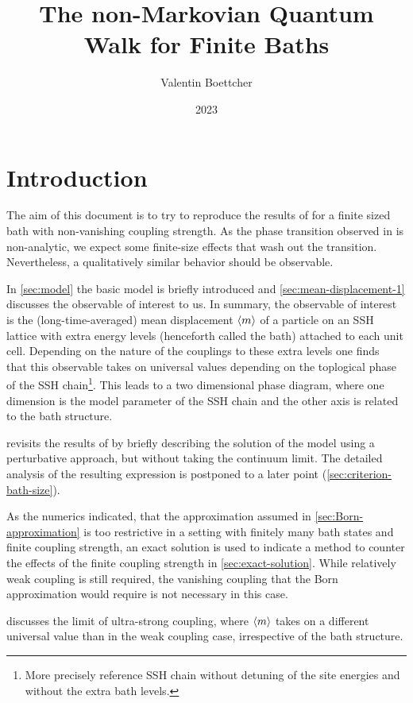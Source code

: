 \documentclass[fontsize=10pt,paper=b5,open=any,
twoside=no,toc=listof,toc=bibliography,headings=optiontohead,
captions=nooneline,captions=tableabove,english,DIV=15,numbers=noenddot,final,parskip=half-,
headinclude=true,footinclude=false,BCOR=0mm]{scrartcl}
\author{Valentin Boettcher}
\title{The non-Markovian Quantum Walk for Finite Baths}
\date{2023}
\begin{document}
\maketitle
\tableofcontents


\section{Introduction}
\label{sec:introduction}
The aim of this document is to try to reproduce the results of
\cite{Ricottone2020} for a finite sized bath with non-vanishing
coupling strength. As the phase transition observed in
 is non-analytic, we expect some finite-size
effects that wash out the transition. Nevertheless, a qualitatively
similar behavior should be observable.

In \cref{sec:model} the basic model is briefly introduced and
\cref{sec:mean-displacement-1} discusses the observable of interest to
us. In summary, the observable of interest is the (long-time-averaged)
mean displacement \(\ev{m}\) of a particle on an SSH lattice with
extra energy levels (henceforth called the bath) attached to each unit
cell. Depending on the nature of the couplings to these extra levels
one finds~\cite{Ricottone2020} that this observable takes on universal
values depending on the toplogical phase of the SSH
chain\footnote{More precisely reference SSH chain without detuning of
  the site energies and without the extra bath levels.}. This leads to
a two dimensional phase diagram, where one dimension is the model
parameter of the SSH chain and the other axis is related to the bath
structure.

 revisits the results of
 by briefly describing the solution of the
model using a perturbative approach, but without taking the continuum
limit. The detailed analysis of the resulting expression is postponed
to a later point (\cref{sec:criterion-bath-size}).

As the numerics indicated, that the approximation assumed in
\cref{sec:Born-approximation} is too restrictive in a setting with
finitely many bath states and finite coupling strength, an exact
solution is used to indicate a method to counter the effects of the
finite coupling strength in \cref{sec:exact-solution}. While
relatively weak coupling is still required, the vanishing coupling
that the Born approximation would require is not necessary in this
case.

 discusses the limit of ultra-strong
coupling, where \(\ev{m}\) takes on a different universal value than
in the weak coupling case, irrespective of the bath structure.
\end{document}
